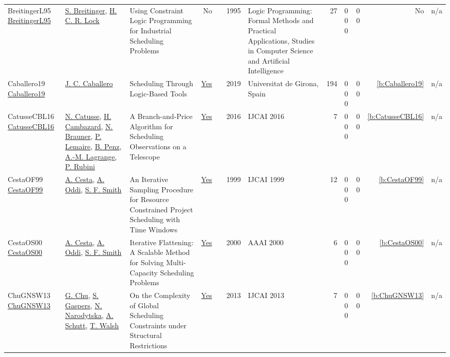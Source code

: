 {\begin{longtable}{>{\raggedright\arraybackslash}p{3cm}>{\raggedright\arraybackslash}p{4.5cm}>{\raggedright\arraybackslash}p{6.0cm}rrrp{2.5cm}rp{1cm}p{1cm}rr}
BreitingerL95 \href{}{BreitingerL95} & \hyperref[auth:a695]{S. Breitinger}, \hyperref[auth:a696]{H. C. R. Lock} & Using Constraint Logic Programming for Industrial Scheduling Problems & No & \cite{BreitingerL95} & 1995 & Logic Programming: Formal Methods and Practical Applications, Studies in Computer Science and Artificial Intelligence & 27 & 0 0 0 & 0 0 & No & n/a\\
Caballero19 \href{https://www.tesisenred.net/handle/10803/667963#page=1}{Caballero19} & \hyperref[auth:a102]{J. C. Caballero} & Scheduling Through Logic-Based Tools & \href{../works/Caballero19.pdf}{Yes} & \cite{Caballero19} & 2019 & Universitat de Girona, Spain & 194 & 0 0 0 & 0 0 & \ref{b:Caballero19} & n/a\\
CatusseCBL16 \href{http://www.ijcai.org/Abstract/16/434}{CatusseCBL16} & \hyperref[auth:a998]{N. Catusse}, \hyperref[auth:a999]{H. Cambazard}, \hyperref[auth:a1000]{N. Brauner}, \hyperref[auth:a979]{P. Lemaire}, \hyperref[auth:a1001]{B. Penz}, \hyperref[auth:a1002]{A.-M. Lagrange}, \hyperref[auth:a1003]{P. Rubini} & A Branch-and-Price Algorithm for Scheduling Observations on a Telescope & \href{../works/CatusseCBL16.pdf}{Yes} & \cite{CatusseCBL16} & 2016 & IJCAI 2016 & 7 & 0 0 0 & 0 0 & \ref{b:CatusseCBL16} & n/a\\
CestaOF99 \href{http://ijcai.org/Proceedings/99-2/Papers/051.pdf}{CestaOF99} & \hyperref[auth:a284]{A. Cesta}, \hyperref[auth:a282]{A. Oddi}, \hyperref[auth:a298]{S. F. Smith} & An Iterative Sampling Procedure for Resource Constrained Project Scheduling with Time Windows & \href{../works/CestaOF99.pdf}{Yes} & \cite{CestaOF99} & 1999 & IJCAI 1999 & 12 & 0 0 0 & 0 0 & \ref{b:CestaOF99} & n/a\\
CestaOS00 \href{http://www.aaai.org/Library/AAAI/2000/aaai00-114.php}{CestaOS00} & \hyperref[auth:a284]{A. Cesta}, \hyperref[auth:a282]{A. Oddi}, \hyperref[auth:a298]{S. F. Smith} & Iterative Flattening: {A} Scalable Method for Solving Multi-Capacity Scheduling Problems & \href{../works/CestaOS00.pdf}{Yes} & \cite{CestaOS00} & 2000 & AAAI 2000 & 6 & 0 0 0 & 0 0 & \ref{b:CestaOS00} & n/a\\
ChuGNSW13 \href{http://www.aaai.org/ocs/index.php/IJCAI/IJCAI13/paper/view/6878}{ChuGNSW13} & \hyperref[auth:a343]{G. Chu}, \hyperref[auth:a793]{S. Gaspers}, \hyperref[auth:a794]{N. Narodytska}, \hyperref[auth:a124]{A. Schutt}, \hyperref[auth:a276]{T. Walsh} & On the Complexity of Global Scheduling Constraints under Structural Restrictions & \href{../works/ChuGNSW13.pdf}{Yes} & \cite{ChuGNSW13} & 2013 & IJCAI 2013 & 7 & 0 0 0 & 0 0 & \ref{b:ChuGNSW13} & n/a\\

\end{longtable}}
